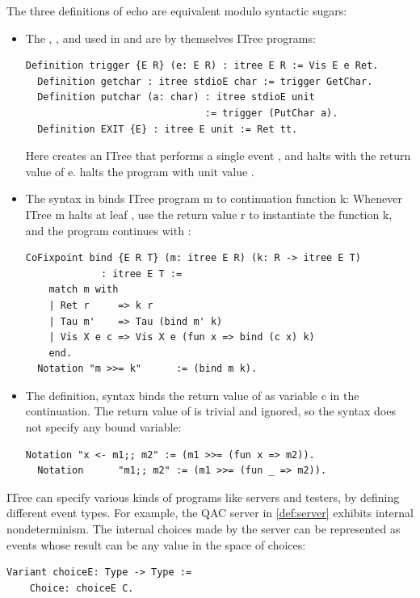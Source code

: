 The three definitions of echo are equivalent modulo syntactic sugars:
\begin{itemize}
\item The , , and  used in  and
   are by themselves ITree programs:
\begin{lstlisting}[style=customcoq]
  Definition trigger {E R} (e: E R) : itree E R := Vis E e Ret.
  Definition getchar : itree stdioE char := trigger GetChar.
  Definition putchar (a: char) : itree stdioE unit
                               := trigger (PutChar a).
  Definition EXIT {E} : itree E unit := Ret tt.
\end{lstlisting}
Here  creates an ITree that performs a single event , and halts with the return value of \ilc e.   halts the program
with unit value .

\item The  syntax in  binds ITree program \ilc m to
  continuation function \ilc k: Whenever ITree \ilc m halts at leaf , use the return value \ilc r to instantiate the function \ilc k, and the
  program continues with :
\begin{lstlisting}[style=customcoq]
  CoFixpoint bind {E R T} (m: itree E R) (k: R -> itree E T)
             : itree E T :=
    match m with
    | Ret r     => k r
    | Tau m'    => Tau (bind m' k)
    | Vis X e c => Vis X e (fun x => bind (c x) k)
    end.
  Notation "m >>= k"      := (bind m k).
\end{lstlisting}

\item The  definition, syntax  binds the
  return value of  as variable \ilc c in the continuation.  The
  return value of  is trivial and ignored, so the syntax
   does not specify any bound variable:
\begin{lstlisting}[style=customcoq]
  Notation "x <- m1;; m2" := (m1 >>= (fun x => m2)).
  Notation      "m1;; m2" := (m1 >>= (fun _ => m2)).
\end{lstlisting}
\end{itemize}

ITree can specify various kinds of programs like servers and testers, by
defining different event types.  For example, the QAC server in
\autoref{def:server} exhibits internal nondeterminism.  The internal choices
made by the server can be represented as  events whose result can be
any value in the space of choices:
\begin{lstlisting}[style=customcoq]
  Variant choiceE: Type -> Type :=
    Choice: choiceE C.
\end{lstlisting}

